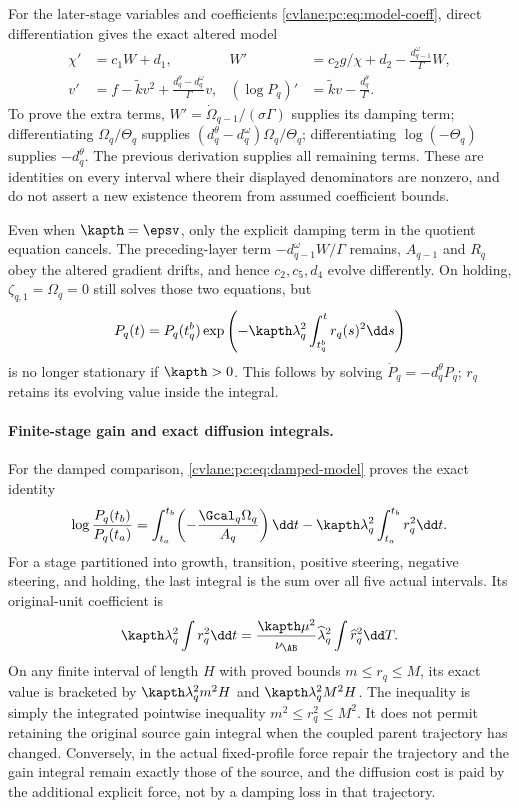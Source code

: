 For the later-stage variables and coefficients \eqref{cvlane:pc:eq:model-coeff}, direct differentiation gives the exact altered model
\begin{align}\label{cvlane:pc:eq:damped-model}
 \chi'&=c_1W+d_1,&
 W'&=c_2g/\chi+d_2-\frac{d_{q-1}^\omega}{\Gamma}W,\\
 v'&=f-\widetilde k v^2+\frac{d_q^\theta-d_q^\omega}{\Gamma}v,&
 (\log P_q)'&=\widetilde k v-\frac{d_q^\theta}{\Gamma}.\nonumber
\end{align}
To prove the extra terms, $W'=\dot\Omega_{q-1}/(\sigma\Gamma)$ supplies its damping term; differentiating $\Omega_q/\Theta_q$ supplies $(d_q^\theta-d_q^\omega)\Omega_q/\Theta_q$; differentiating $\log(-\Theta_q)$ supplies $-d_q^\theta$. The previous derivation supplies all remaining terms. These are identities on every interval where their displayed denominators are nonzero, and do not assert a new existence theorem from assumed coefficient bounds.

Even when $\kapth=\epsv$, only the explicit damping term in the quotient equation cancels. The preceding-layer term $-d_{q-1}^\omega W/\Gamma$ remains, $A_{q-1}$ and $R_q$ obey the altered gradient drifts, and hence $c_2,c_5,d_4$ evolve differently. On holding, $\zeta_{q,1}=\Omega_q=0$ still solves those two equations, but
\[
 P_q(t)=P_q(t_q^b)\exp\left(-\kapth\lambda_q^2\int_{t_q^b}^{t}r_q(s)^2\dd s\right)
\]
is no longer stationary if $\kapth>0$. This follows by solving $\dot P_q=-d_q^\theta P_q$; $r_q$ retains its evolving value inside the integral.

\paragraph{Finite-stage gain and exact diffusion integrals.}
For the damped comparison, \eqref{cvlane:pc:eq:damped-model} proves the exact identity
\[
 \log\frac{P_q(t_b)}{P_q(t_a)}
 =\int_{t_a}^{t_b}\!\left(-\frac{\Gcal_q\Omega_q}{A_q}\right)\dd t
 -\kapth\lambda_q^2\int_{t_a}^{t_b}r_q^2\dd t.
\]
For a stage partitioned into growth, transition, positive steering, negative steering, and holding, the last integral is the sum over all five actual intervals. Its original-unit coefficient is
\[
 \kapth\lambda_q^2\int r_q^2\dd t
 =\frac{\kapth\mu^2}{\nu_{\AB}}\widehat\lambda_q^2
 \int \widehat r_q^2\dd T.
\]
On any finite interval of length $H$ with proved bounds $m\le r_q\le M$, its exact value is bracketed by $\kapth\lambda_q^2m^2H$ and $\kapth\lambda_q^2M^2H$. The inequality is simply the integrated pointwise inequality $m^2\le r_q^2\le M^2$. It does not permit retaining the original source gain integral when the coupled parent trajectory has changed. Conversely, in the actual fixed-profile force repair the trajectory and the gain integral remain exactly those of the source, and the diffusion cost is paid by the additional explicit force, not by a damping loss in that trajectory.


